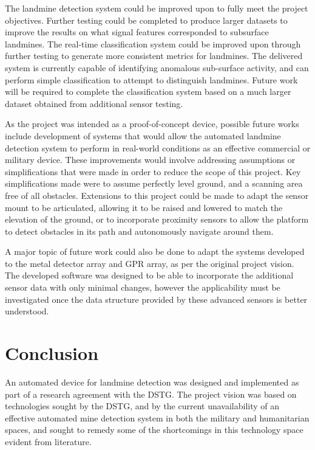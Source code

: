 \documentclass[main.tex]{subfiles}
\begin{document}
The landmine detection system could be improved upon to fully meet the project objectives. Further testing could be completed to produce larger datasets to improve the results on what signal features corresponded to subsurface landmines. The real-time classification system could be improved upon through further testing to generate more consistent metrics for landmines. The delivered system is currently capable of identifying anomalous sub-surface activity, and can perform simple classification to attempt to distinguish landmines. Future work will be required to complete the classification system based on a much larger dataset obtained from additional sensor testing. 


As the project was intended as a proof-of-concept device, possible future works include development of systems that would allow the automated landmine detection system to perform in real-world conditions as an effective commercial or military device. These improvements would involve addressing assumptions or simplifications that were made in order to reduce the scope of this project. Key simplifications made were to assume perfectly level ground, and a scanning area free of all obstacles. Extensions to this project could be made to adapt the sensor mount to be articulated, allowing it to be raised and lowered to match the elevation of the ground, or to incorporate proximity sensors to allow the platform to detect obstacles in its path and autonomously navigate around them.

A major topic of future work could also be done to adapt the systems developed to the metal detector array and GPR array, as per the original project vision. The developed software was designed to be able to incorporate the additional sensor data with only minimal changes, however the applicability must be investigated once the data structure provided by these advanced sensors is better understood.

\section{Conclusion}
An automated device for landmine detection was designed and implemented as part of a research agreement with the DSTG. 
The project vision was based on technologies sought by the DSTG, and by the current unavailability of an effective automated mine detection system in both the military and humanitarian spaces, and sought to remedy some of the shortcomings in this technology space evident from literature.\\
\end{document}
